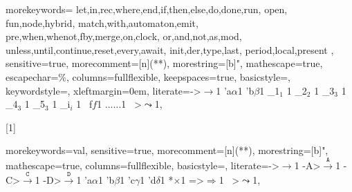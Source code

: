 
   {morekeywords={
	let,in,rec,where,end,if,then,else,do,done,run,
	open,
	fun,node,hybrid,
	match,with,automaton,emit,
	pre,when,whenot,fby,merge,on,clock,
	or,and,not,as,mod,
	unless,until,continue,reset,every,await,
	init,der,type,last,
	period,local,present
    },
    sensitive=true,
    morecomment=[n]{(*}{*)},
    morestring=[b]",
    mathescape=true,
    escapechar=\%,
    columns=fullflexible,
    keepspaces=true,
    basicstyle=\sffamily\footnotesize,
    keywordstyle=\blue,
    xleftmargin=0em,
    literate={->}{{$\rightarrow$}}1
             {'a}{{$\alpha$}}1
             {'b}{{$\beta$}}1
             {_1}{{$_1$ }}1
             {_2}{{$_2$ }}1
             {_3}{{$_3$ }}1
             {_4}{{$_3$ }}1
             {_5}{{$_3$ }}1
             {_i}{{$_i$ }}1
             {~f}{{$f$}}1
             {...}{{$\ldots$}}1
             {~>}{{$\leadsto$}}1,
    }

[1]
    {\lstset{language=zelus,basicstyle=\sffamily#1}}
    {}


\newcommand{\zl}[1]{%
    \mbox{\lstinline[language=zelus,columns=fullflexible]{#1}}}

\newcommand{\zlt}[1]{%
    \mbox{\lstinline[language=zelus,columns=fullflexible,
                     basicstyle=\tiny,keywordstyle=\bfseries]{#1}}}

   {morekeywords={val},
    sensitive=true,
    morecomment=[n]{(*}{*)},
    morestring=[b]",
    mathescape=true,
    columns=fullflexible,
    basicstyle=\sffamily\footnotesize,
    literate={->}{{$\rightarrow$}}1
             {-A>}{{$\stackrel{\mathtt{A}}{\rightarrow}$}}1
             {-C>}{{$\stackrel{\mathtt{C}}{\rightarrow}$}}1
             {-D>}{{$\stackrel{\mathtt{D}}{\rightarrow}$}}1
             {'a}{{$\alpha$}}1
             {'b}{{$\beta$}}1
             {'c}{{$\gamma$}}1
             {'d}{{$\delta$}}1
             {*}{{$\times$}}1
             {=>}{{$\Rightarrow$}}1
             {~>}{{$\leadsto$}}1,
    }

    {\lstset{language=zelusoutput}}
    {}

\newcommand{\zlo}[1]{%
    \mbox{\lstinline[language=zelusoutput,columns=fullflexible]{#1}}}

